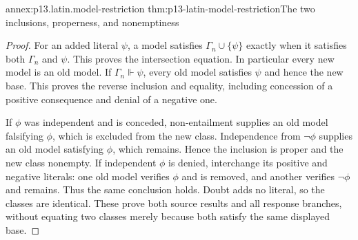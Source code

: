 \begin{annexitem}{annex:p13.latin.model-restriction}
 {thm:p13-latin-model-restriction}{The two inclusions, properness, and nonemptiness}
\begin{proof}
For an added literal \(\psi\), a model satisfies
\(\Gamma_n\cup\{\psi\}\) exactly when it satisfies both \(\Gamma_n\)
and \(\psi\). This proves the intersection equation.
In particular every new model is an old model.
If \(\Gamma_n\Vdash\psi\), every old model satisfies \(\psi\)
and hence the new base. This proves the reverse inclusion and equality,
including concession of a positive consequence and denial of a negative one.

If \(\phi\) was independent and is conceded, non-entailment supplies
an old model falsifying \(\phi\), which is excluded from the new class.
Independence from \(\neg\phi\) supplies an old model satisfying \(\phi\),
which remains. Hence the inclusion is proper and the new class nonempty.
If independent \(\phi\) is denied, interchange its positive and negative
literals: one old model verifies \(\phi\) and is removed, and another
verifies \(\neg\phi\) and remains. Thus the same conclusion holds.
Doubt adds no literal, so the classes are identical.
These prove both source results and all response branches, without
equating two classes merely because both satisfy the same displayed base.
\end{proof}
\end{annexitem}

